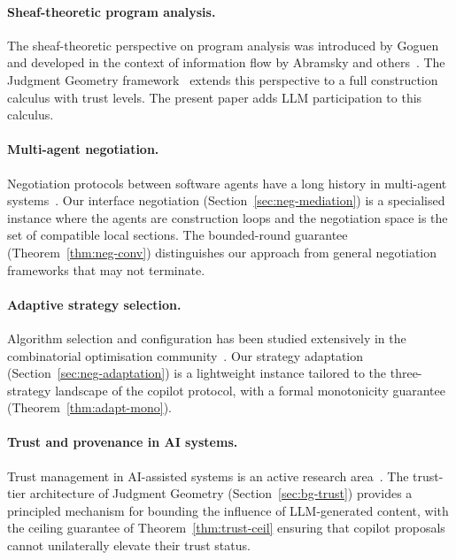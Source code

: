 \documentclass[11pt]{article}
\begin{document}
\paragraph{Sheaf-theoretic program analysis.}
The sheaf-theoretic perspective on program analysis was introduced
by Goguen~\cite{goguen1992sheaves} and developed in the context of
information flow by Abramsky and others~\cite{abramsky2011sheaves,
abramsky2015contextuality}.  The Judgment Geometry
framework~\cite{jugeo-foundations,jugeo-descent,jugeo-gluing,
jugeo-loops} extends this perspective to a full construction
calculus with trust levels.  The present paper adds LLM
participation to this calculus.

\paragraph{Multi-agent negotiation.}
Negotiation protocols between software agents have a long history
in multi-agent systems~\cite{wooldridge2009multiagent,
jennings2001automated}.  Our interface negotiation
(Section~\ref{sec:neg-mediation}) is a specialised instance where
the agents are construction loops and the negotiation space is the
set of compatible local sections.  The bounded-round guarantee
(Theorem~\ref{thm:neg-conv}) distinguishes our approach from
general negotiation frameworks that may not terminate.

\paragraph{Adaptive strategy selection.}
Algorithm selection and configuration has been studied extensively
in the combinatorial optimisation
community~\cite{rice1976algorithm,hutter2011sequential,
kotthoff2016algorithm}.  Our strategy adaptation
(Section~\ref{sec:neg-adaptation}) is a lightweight instance
tailored to the three-strategy landscape of the copilot protocol,
with a formal monotonicity guarantee
(Theorem~\ref{thm:adapt-mono}).

\paragraph{Trust and provenance in AI systems.}
Trust management in AI-assisted systems is an active research
area~\cite{winfield2021trustworthy,thiebes2021trustworthy}.  The
trust-tier architecture of Judgment Geometry
(Section~\ref{sec:bg-trust}) provides a principled mechanism for
bounding the influence of LLM-generated content, with the ceiling
guarantee of Theorem~\ref{thm:trust-ceil} ensuring that copilot
proposals cannot unilaterally elevate their trust status.
\end{document}
